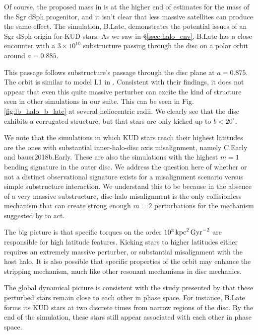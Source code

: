 Of course, the proposed mass in \citet{laporte_2018_b} is at the higher end of estimates for the mass of the Sgr dSph progenitor, and it isn't clear that less massive satellites can produce the same effect. The simulation, B.Late, demonstrates the potential issues of an Sgr dSph origin for KUD stars. As we saw in \S\ref{ssec:halo_env}, B.Late has a close encounter with a $3 \times 10^{10}$ substructure passing through the disc on a polar orbit around $a=0.885$. 

This passage follows substructure's passage through the disc plane at $a=0.875$. The orbit is similar to model L1 in \citet{laporte_2018_b}. Consistent with their findings, it does not appear that even this quite massive perturber can excite the kind of structure seen in other simulations in our suite. This can be seen in Fig. \ref{fig:lb_halo_b_late} at several heliocentric radii. We clearly see that the disc exhibits a corrugated structure, but that stars are only kicked up to $b<20^\circ$. 

We note that the simulations in which KUD stars reach their highest latitudes are the ones with substantial inner-halo-disc axis misalignment, namely C.Early and bauer2018b.Early. These are also the simulations with the highest $m=1$ bending signature in the outer disc. We address the question here of whether or not a distinct observational signature exists for a misalignment scenario versus simple substructure interaction. We understand this to be because in the absence of a very massive substructure, disc-halo misalignment is the only collisionless mechanism that can create strong enough $m=2$ perturbations for the mechanism suggested by \citet{laporte_2019_feathers} to act.

The big picture is that specific torques on the order $10^3 \, \text{kpc}^2\,\text{Gyr}^{-2}$ are responsible for high latitude features. Kicking stars to higher latitudes either requires an extremely massive perturber, or substantial misalignment with the host halo. It is also possible that specific properties of the orbit may enhance the stripping mechanism, much like other resonant mechanisms in disc mechanics.

The global dynamical picture is consistent with the study presented by \citet{laporte_2019_feathers} that these perturbed stars remain close to each other in phase space. For instance, B.Late forms its KUD stars at two discrete times from narrow regions of the disc. By the end of the simulation, these stars still appear associated with each other in phase space. 

